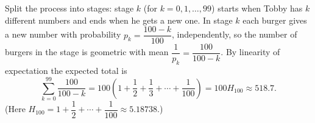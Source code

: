 Split the process into stages: stage $k$ (for $k=0,1,\dots,99$) starts when Tobby has $k$ different numbers and ends when he gets a new one. In stage $k$ each burger gives a new number with probability $p_k=\dfrac{100-k}{100}$, independently, so the number of burgers in the stage is geometric with mean $\dfrac{1}{p_k}=\dfrac{100}{100-k}$. By linearity of expectation the expected total is
\[\sum_{k=0}^{99}\dfrac{100}{100-k}=100\left(1+\dfrac{1}{2}+\dfrac{1}{3}+\cdots+\dfrac{1}{100}\right)=\boxed{100H_{100}\approx518.7}.\]
(Here $H_{100}=1+\dfrac{1}{2}+\cdots+\dfrac{1}{100}\approx5.18738$.)
